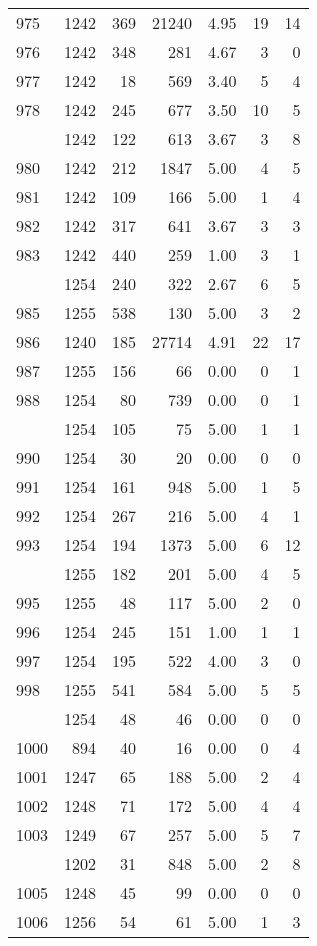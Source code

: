 \documentclass[
]{article}
\begin{document}
\begin{table}
\begin{tabular}[t]{lrrrrrr}
975 & 1242 & 369 & 21240 & 4.95 & 19 & 14\\
976 & 1242 & 348 & 281 & 4.67 & 3 & 0\\
977 & 1242 & 18 & 569 & 3.40 & 5 & 4\\
978 & 1242 & 245 & 677 & 3.50 & 10 & 5\\
\addlinespace
979 & 1242 & 122 & 613 & 3.67 & 3 & 8\\
980 & 1242 & 212 & 1847 & 5.00 & 4 & 5\\
981 & 1242 & 109 & 166 & 5.00 & 1 & 4\\
982 & 1242 & 317 & 641 & 3.67 & 3 & 3\\
983 & 1242 & 440 & 259 & 1.00 & 3 & 1\\
\addlinespace
984 & 1254 & 240 & 322 & 2.67 & 6 & 5\\
985 & 1255 & 538 & 130 & 5.00 & 3 & 2\\
986 & 1240 & 185 & 27714 & 4.91 & 22 & 17\\
987 & 1255 & 156 & 66 & 0.00 & 0 & 1\\
988 & 1254 & 80 & 739 & 0.00 & 0 & 1\\
\addlinespace
989 & 1254 & 105 & 75 & 5.00 & 1 & 1\\
990 & 1254 & 30 & 20 & 0.00 & 0 & 0\\
991 & 1254 & 161 & 948 & 5.00 & 1 & 5\\
992 & 1254 & 267 & 216 & 5.00 & 4 & 1\\
993 & 1254 & 194 & 1373 & 5.00 & 6 & 12\\
\addlinespace
994 & 1255 & 182 & 201 & 5.00 & 4 & 5\\
995 & 1255 & 48 & 117 & 5.00 & 2 & 0\\
996 & 1254 & 245 & 151 & 1.00 & 1 & 1\\
997 & 1254 & 195 & 522 & 4.00 & 3 & 0\\
998 & 1255 & 541 & 584 & 5.00 & 5 & 5\\
\addlinespace
999 & 1254 & 48 & 46 & 0.00 & 0 & 0\\
1000 & 894 & 40 & 16 & 0.00 & 0 & 4\\
1001 & 1247 & 65 & 188 & 5.00 & 2 & 4\\
1002 & 1248 & 71 & 172 & 5.00 & 4 & 4\\
1003 & 1249 & 67 & 257 & 5.00 & 5 & 7\\
\addlinespace
1004 & 1202 & 31 & 848 & 5.00 & 2 & 8\\
1005 & 1248 & 45 & 99 & 0.00 & 0 & 0\\
1006 & 1256 & 54 & 61 & 5.00 & 1 & 3\\

\end{tabular}
\end{table}
\end{document}
